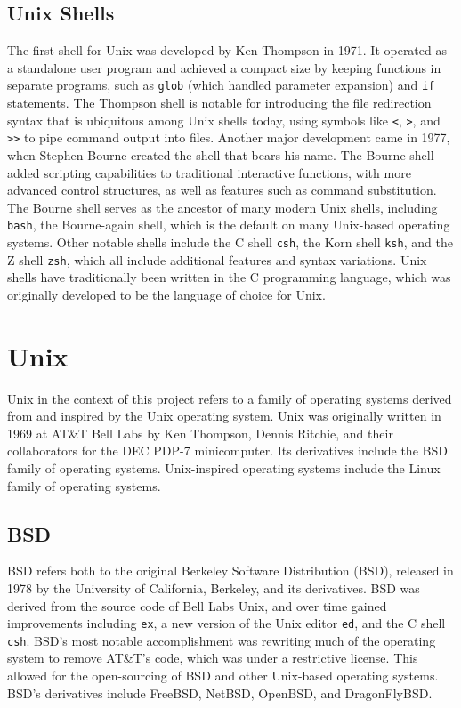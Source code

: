 \documentclass[12pt,twoside]{report} %
\begin{document}
	\subsection{Unix Shells} \label{sec:unix-shells}
	The first shell for Unix was developed by Ken Thompson in 1971. It operated as a standalone user program and achieved a compact size by keeping functions in separate programs, such as \verb|glob| (which handled parameter expansion) and \verb|if| statements. The Thompson shell is notable for introducing the file redirection syntax that is ubiquitous among Unix shells today, using symbols like \verb|<|, \verb|>|, and \verb|>>| to pipe command output into files. Another major development came in 1977, when Stephen Bourne created the shell that bears his name. The Bourne shell added scripting capabilities to traditional interactive functions, with more advanced control structures, as well as features such as command substitution. The Bourne shell serves as the ancestor of many modern Unix shells, including \verb|bash|, the Bourne-again shell, which is the default on many Unix-based operating systems. Other notable shells include the C shell \verb|csh|, the Korn shell \verb|ksh|, and the Z shell \verb|zsh|, which all include additional features and syntax variations. Unix shells have traditionally been written in the C programming language, which was originally developed to be the language of choice for Unix.

	\section{Unix} \label{sec:unix}
	Unix in the context of this project refers to a family of operating systems derived from and inspired by the Unix operating system. Unix was originally written in 1969 at AT\&T Bell Labs by Ken Thompson, Dennis Ritchie, and their collaborators for the DEC PDP-7 minicomputer. Its derivatives include the BSD family of operating systems. Unix-inspired operating systems include the Linux family of operating systems.

	\subsection{BSD} \label{sec:bsd}
	BSD refers both to the original Berkeley Software Distribution (BSD), released in 1978 by the University of California, Berkeley, and its derivatives. BSD was derived from the source code of Bell Labs Unix, and over time gained improvements including \verb|ex|, a new version of the Unix editor \verb|ed|, and the C shell \verb|csh|. BSD's most notable accomplishment was rewriting much of the operating system to remove AT\&T's code, which was under a restrictive license. This allowed for the open-sourcing of BSD and other Unix-based operating systems. BSD's derivatives include FreeBSD, NetBSD, OpenBSD, and DragonFlyBSD.
\end{document}
